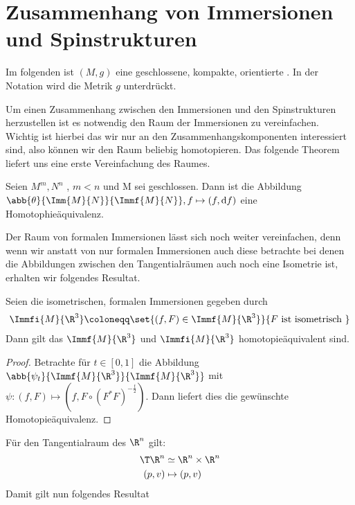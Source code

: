 


\section{Zusammenhang von Immersionen und Spinstrukturen}

Im folgenden ist $(M,g)$ eine geschlossene, kompakte, orientierte \mfg.
In der Notation wird die Metrik $g$ unterdrückt.


Um einen Zusammenhang zwischen den Immersionen und den Spinstrukturen
herzustellen ist es notwendig den Raum der Immersionen zu vereinfachen.
Wichtig ist hierbei das wir nur an den Zusammenhangskomponenten interessiert
sind, also können wir den Raum beliebig homotopieren. Das folgende Theorem
liefert uns eine erste Vereinfachung des Raumes.
\begin{Thm}
	Seien $M^m,N^n$ \mfgen, $m<n$ und M sei geschlossen. Dann ist die Abbildung
	$\abb{\theta}{\Imm{M}{N}}{\Immf{M}{N}}, f \mapsto (f,\mathrm{d} f)$ eine Homotophieäquivalenz.
\end{Thm}

Der Raum von formalen Immersionen lässt sich noch weiter vereinfachen, denn wenn
wir anstatt von nur formalen Immersionen auch diese betrachte bei denen
die Abbildungen zwischen den Tangentialräumen auch noch eine Isometrie ist,
erhalten wir folgendes Resultat.


\begin{Satz}
	Seien die isometrischen, formalen Immersionen gegeben durch
	\begin{gather*}
	\Immfi{M}{\R^3} \coloneqq \set{(f,F) \in \Immf{M}{\R^3}}{F \text{ ist isometrisch }}
	\end{gather*}
	Dann gilt das $\Immf{M}{\R^3}$ und $\Immfi{M}{\R^3}$ homotopieäquivalent sind.
	\begin{proof}
		Betrachte für $t \in [0,1]$ die Abbildung $\abb{\psi_t}{\Immf{M}{\R^3}}{\Immf{M}{\R^3}}$ mit 
		$\psi : (f,F) \mapsto (f,F \circ (F^{\ast}F)^{-\frac{t}{2}})$.
		Dann liefert dies die gewünschte Homotopieäquivalenz.
	\end{proof}
\end{Satz}

Für den Tangentialraum des $\R^n$ gilt:
\begin{align*}
	\T \R^n &\simeq \R^n \times \R^n \\
	(p,v) &\mapsto (p,v)
\end{align*}
Damit gilt nun folgendes Resultat

